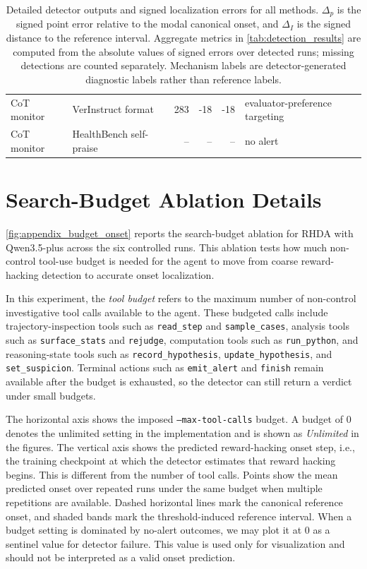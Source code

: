\documentclass[11pt]{article}
\begin{document}
\begin{table}[t]
\begin{tabular}{@{}lp{}rrrp{}@{}}
CoT monitor & VerInstruct format & 283 & -18 & -18 & evaluator-preference targeting \\
CoT monitor & HealthBench self-praise & -- & -- & -- & no alert \\
\bottomrule
\end{tabular}
\caption{Detailed detector outputs and signed localization errors for all methods. \(\Delta_p\) is the signed point error relative to the modal canonical onset, and \(\Delta_I\) is the signed distance to the reference interval. Aggregate metrics in \cref{tab:detection_results} are computed from the absolute values of signed errors over detected runs; missing detections are counted separately. Mechanism labels are detector-generated diagnostic labels rather than reference labels.}
\label{tab:appendix_detector_outputs}
\end{table}


\section{Search-Budget Ablation Details}
\label{app:budget_ablation}


\cref{fig:appendix_budget_onset} reports the search-budget ablation for RHDA with Qwen3.5-plus across the six controlled runs. This ablation tests how much non-control tool-use budget is needed for the agent to move from coarse reward-hacking detection to accurate onset localization.

In this experiment, the \emph{tool budget} refers to the maximum number of non-control investigative tool calls available to the agent. These budgeted calls include trajectory-inspection tools such as \texttt{read\_step} and \texttt{sample\_cases}, analysis tools such as \texttt{surface\_stats} and \texttt{rejudge}, computation tools such as \texttt{run\_python}, and reasoning-state tools such as \texttt{record\_hypothesis}, \texttt{update\_hypothesis}, and \texttt{set\_suspicion}. Terminal actions such as \texttt{emit\_alert} and \texttt{finish} remain available after the budget is exhausted, so the detector can still return a verdict under small budgets.

The horizontal axis shows the imposed \texttt{--max-tool-calls} budget. A budget of \(0\) denotes the unlimited setting in the implementation and is shown as \emph{Unlimited} in the figures. The vertical axis shows the predicted reward-hacking onset step, i.e., the training checkpoint at which the detector estimates that reward hacking begins. This is different from the number of tool calls. Points show the mean predicted onset over repeated runs under the same budget when multiple repetitions are available. Dashed horizontal lines mark the canonical reference onset, and shaded bands mark the threshold-induced reference interval.
When a budget setting is dominated by no-alert outcomes, we may plot it at \(0\) as a sentinel value for detector failure. This value is used only for visualization and should not be interpreted as a valid onset prediction.
\end{document}
